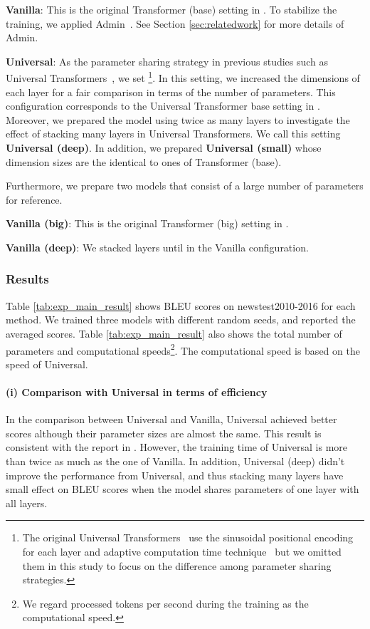 \documentclass[11pt]{article}
\begin{document}
\noindent\textbf{Vanilla}: This is the original Transformer (base) setting in \cite{NIPS2017_7181}.
To stabilize the training, we applied Admin~\cite{liu-etal-2020-understanding}.
See Section \ref{sec:relatedwork} for more details of Admin.

\noindent\textbf{Universal}: As the parameter sharing strategy in previous studies such as Universal Transformers~\cite{dehghani2019}, we set \footnote{The original Universal Transformers~\cite{dehghani2019} use the sinusoidal positional encoding for each layer and adaptive computation time technique~\cite{graves2017adaptive} but we omitted them in this study to focus on the difference among parameter sharing strategies.}.
In this setting, we increased the dimensions of each layer for a fair comparison in terms of the number of parameters.
This configuration corresponds to the Universal Transformer base setting in \cite{dehghani2019}.
Moreover, we prepared the model using twice as many layers to investigate the effect of stacking many layers in Universal Transformers.
We call this setting \textbf{Universal (deep)}.
In addition, we prepared \textbf{Universal (small)} whose dimension sizes are the identical to ones of Transformer (base).


Furthermore, we prepare two models that consist of a large number of parameters for reference.

\noindent\textbf{Vanilla (big)}: This is the original Transformer (big) setting in \cite{NIPS2017_7181}.

\noindent\textbf{Vanilla (deep)}: We stacked layers until  in the Vanilla configuration.


\subsubsection{Results}
Table \ref{tab:exp_main_result} shows BLEU scores on newstest2010-2016 for each method.
We trained three models with different random seeds, and reported the averaged scores.
Table \ref{tab:exp_main_result} also shows the total number of parameters and computational speeds\footnote{We regard processed tokens per second during the training as the computational speed.}.
The computational speed is based on the speed of Universal.


\paragraph{(i) Comparison with Universal in terms of efficiency}
In the comparison between Universal and Vanilla, Universal achieved better scores although their parameter sizes are almost the same.
This result is consistent with the report in \cite{dehghani2019}.
However, the training time of Universal is more than twice as much as the one of Vanilla.
In addition, Universal (deep) didn't improve the performance from Universal, and thus stacking many layers have small effect on BLEU scores when the model shares parameters of one layer with all layers.
\end{document}
